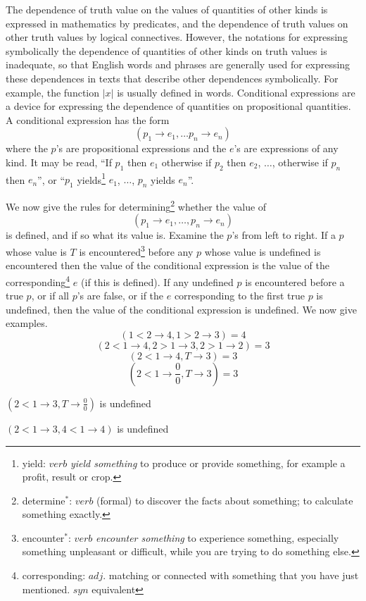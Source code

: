 \documentclass[11pt, a4paper]{article}
\begin{document}
The dependence of truth value on the values of quantities of other kinds is
expressed in mathematics by predicates, and the dependence of truth values on
other truth values by logical connectives. However, the notations for expressing
symbolically the dependence of quantities of other kinds on truth values is
inadequate, so that English words and phrases are generally used for expressing
these dependences in texts that describe other dependences symbolically. For
example, the function $|x|$ is usually defined in words. Conditional expressions
are a device for expressing the dependence of quantities on propositional
quantities. A conditional expression has the form
$$ (p_1 \to e_1, \ldots p_n \to e_n)  $$
where the $p$'s are propositional expressions and the $e$'s are expressions of
any kind. It may be read, ``If $p_1$ then $e_1$ otherwise if $p_2$ then $e_2$,
$\ldots$, otherwise if $p_n$ then $e_n$'', or ``$p_1$
yields\footnote{yield: $verb$ \textit{yield something} to produce or provide
  something, for example a profit, result or crop.}
$e_1$, $\ldots$,
$p_n$ yields $e_n$''.

We now give the rules for
determining\footnote{determine$^*$: $verb$ (formal) to discover the facts about
  something; to calculate something exactly.}
whether the value of
$$ (p_1 \to e_1, \ldots, p_n \to e_n) $$
is defined, and if so what its value is. Examine the $p$'s from left to
right. If a $p$ whose value is $T$ is
encountered\footnote{encounter$^*$: $verb$ \textit{encounter something} to
  experience something, especially something unpleasant or difficult, while you
  are trying to do something else.}
before any $p$ whose value is
undefined is encountered then the value of the conditional expression is the
value of the
corresponding\footnote{corresponding: $adj.$ matching or connected with
  something that you have just mentioned. $syn$ equivalent}
$e$ (if this is defined). If any undefined $p$ is
encountered before a true $p$, or if all $p$'s are false, or if the $e$
corresponding to the first true $p$ is undefined, then the value of the
conditional expression is undefined. We now give examples.
$$ (1 < 2 \to 4, 1 > 2 \to 3) = 4 $$
$$ (2 < 1 \to 4, 2 > 1 \to 3, 2 > 1 \to 2) = 3 $$
$$ (2 < 1 \to 4, T \to 3) = 3 $$
$$ (2 < 1 \to \frac{0}{0}, T \to 3) = 3 $$
\begin{center}$ (2 < 1 \to 3, T \to \displaystyle\frac{0}{0}) $
  is undefined\end{center}
\begin{center}$ (2 < 1 \to 3, 4 < 1 \to 4) $ is
  undefined\end{center}
\end{document}
